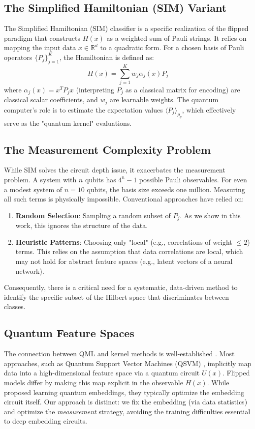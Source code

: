 \documentclass[conference]{IEEEtran}
\begin{document}
\subsection{The Simplified Hamiltonian (SIM) Variant}
The Simplified Hamiltonian (SIM) classifier \cite{tiblias2025efficient} is a specific realization of the flipped paradigm that constructs $H(x)$ as a weighted sum of Pauli strings. It relies on mapping the input data $x \in \mathbb{R}^d$ to a quadratic form. For a chosen basis of Pauli operators $\{P_j\}_{j=1}^K$, the Hamiltonian is defined as:
\begin{equation}
    H(x) = \sum_{j=1}^K w_j \alpha_j(x) P_j
\end{equation}
where $\alpha_j(x) = x^T P_j x$ (interpreting $P_j$ as a classical matrix for encoding) are classical scalar coefficients, and $w_j$ are learnable weights. The quantum computer's role is to estimate the expectation values $\langle P_j \rangle_{\rho_\theta}$, which effectively serve as the "quantum kernel" evaluations.

\subsection{ The Measurement Complexity Problem}
While SIM solves the circuit depth issue, it exacerbates the measurement problem. A system with $n$ qubits has $4^n - 1$ possible Pauli observables. For even a modest system of $n=10$ qubits, the basis size exceeds one million. Measuring all such terms is physically impossible.
Conventional approaches have relied on:
\begin{enumerate}
    \item \textbf{Random Selection}: Sampling a random subset of $P_j$. As we show in this work, this ignores the structure of the data.
    \item \textbf{Heuristic Patterns}: Choosing only "local" (e.g., correlations of weight $\le 2$) terms. This relies on the assumption that data correlations are local, which may not hold for abstract feature spaces (e.g., latent vectors of a neural network).
\end{enumerate}
Consequently, there is a critical need for a systematic, data-driven method to identify the specific subset of the Hilbert space that discriminates between classes.

\subsection{Quantum Feature Spaces}
The connection between QML and kernel methods is well-established \cite{schuld2021supervised, havlicek2019supervised}. Most approaches, such as Quantum Support Vector Machines (QSVM) \cite{havlicek2019supervised}, implicitly map data into a high-dimensional feature space via a quantum circuit $U(x)$. Flipped models \cite{jerbi2024flipped} differ by making this map explicit in the observable $H(x)$. While \cite{lloyd2020quantum} proposed learning quantum embeddings, they typically optimize the embedding circuit itself. Our approach is distinct: we fix the embedding (via data statistics) and optimize the \textit{measurement} strategy, avoiding the training difficulties essential to deep embedding circuits.
\end{document}
